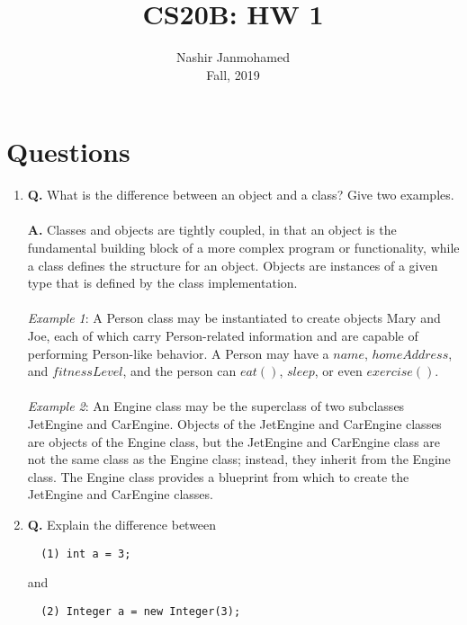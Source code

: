 \documentclass[12pt]{article}
\begin{document}
 
 
\title{CS20B: HW 1}
\author{Nashir Janmohamed\\ %
Fall, 2019}

\maketitle
\section{Questions}
\begin{enumerate}
  \item
  \textbf{Q.} What is the difference between an object and a class? Give two examples.
  \\\\
  \textbf{A.} Classes and objects are tightly coupled, in that an object is the fundamental building block of a more complex program or functionality, while a class defines the structure for an object. Objects are instances of a given type that is defined by the class implementation.
  \\\\
  \textit{Example 1}: A Person class may be instantiated to create objects Mary and Joe, each of which carry Person-related information and are capable of performing Person-like behavior. A Person may have a $name$, $homeAddress$, and $fitnessLevel$, and the person can $eat()$, $sleep$, or even $exercise()$.
  \\\\
  \textit{Example 2}: An Engine class may be the superclass of two subclasses JetEngine and CarEngine. Objects of the JetEngine and CarEngine classes are objects of the Engine class, but the JetEngine and CarEngine class are not the same class as the Engine class; instead, they inherit from the Engine class. The Engine class provides a blueprint from which to create the JetEngine and CarEngine classes.
  \\
  \item
  \textbf{Q.} Explain the difference between
  \begin{lstlisting}
  (1) int a = 3;
  \end{lstlisting}
  and
  \begin{lstlisting}
  (2) Integer a = new Integer(3);
  \end{lstlisting}

\end{enumerate}
\end{document}
